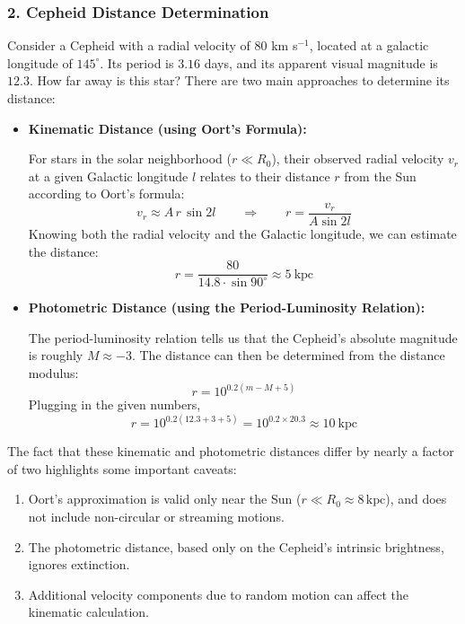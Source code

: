 \subsubsection{2. Cepheid Distance Determination}

Consider a Cepheid with a radial velocity of $80$ km s$^{-1}$, located at a galactic longitude of $145^\circ$. Its period is $3.16$ days, and its apparent visual magnitude is $12.3$. How far away is this star? There are two main approaches to determine its distance:

\begin{itemize}
    \item \textbf{Kinematic Distance (using Oort's Formula):}

    For stars in the solar neighborhood ($r \ll R_0$), their observed radial velocity $v_r$ at a given Galactic longitude $l$ relates to their distance $r$ from the Sun according to Oort's formula:
    $$
    v_r \approx A\,r\,\sin 2l
    \qquad \Rightarrow \qquad
    r = \frac{v_r}{A\sin 2l}
    $$
    Knowing both the radial velocity and the Galactic longitude, we can estimate the distance:
    $$
    r = \frac{80}{14.8 \cdot \sin 90^\circ} \approx 5~\mathrm{kpc}
    $$

    \item \textbf{Photometric Distance (using the Period-Luminosity Relation):}

    The period-luminosity relation tells us that the Cepheid's absolute magnitude is roughly $M \approx -3$. The distance can then be determined from the distance modulus:
    $$
    r = 10^{0.2(m - M + 5)}
    $$
    Plugging in the given numbers,
    $$
    r = 10^{0.2(12.3 + 3 + 5)} = 10^{0.2 \times 20.3} \approx 10~\mathrm{kpc}
    $$
\end{itemize}

The fact that these kinematic and photometric distances differ by nearly a factor of two highlights some important caveats:
\begin{enumerate}
    \item Oort's approximation is valid only near the Sun ($r \ll R_0 \approx 8\,\mathrm{kpc}$), and does not include non-circular or streaming motions.
    \item The photometric distance, based only on the Cepheid's intrinsic brightness, ignores extinction.
    \item Additional velocity components due to random motion can affect the kinematic calculation.
\end{enumerate}